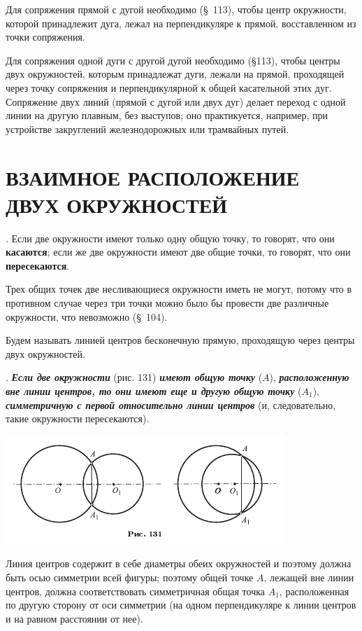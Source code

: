 \documentclass[oneside]{book}
\begin{document}
Для сопряжения прямой с дугой необходимо (§~113), чтобы центр окружности, которой принадлежит дуга, лежал на перпендикуляре к прямой, восставленном из точки сопряжения.

Для сопряжения одной дуги с другой дугой необходимо (§113), чтобы центры двух окружностей, которым принадлежат дуги, лежали на прямой, проходящей через точку сопряжения и перпендикулярной к общей касательной этих дуг.
Сопряжение двух линий (прямой с дугой или двух дуг) делает переход с одной линии на другую плавным, без выступов;
оно практикуется, например, при устройстве закруглений железнодорожных или трамвайных путей.

\section{ВЗАИМНОЕ РАСПОЛОЖЕНИЕ ДВУХ ОКРУЖНОСТЕЙ}

.
Если две окружности имеют только одну общую точку, то говорят, что они \textbf{касаются};
если же две окружности имеют две общие точки, то говорят, что они \textbf{пересекаются}.

Трех общих точек две несливающиеся окружности иметь не могут, потому что в противном случае через три точки можно было бы провести две различные окружности, что невозможно (§~104).

Будем называть линией центров бесконечную прямую, проходящую через центры двух окружностей.

.
\textbf{\emph{Если две окружности}} (рис. 131) \textbf{\emph{имеют общую точку}} ($A$), \textbf{\emph{расположенную вне линии центров, то они имеют еще и другую общую точку}} ($A_1$), \textbf{\emph{симметричную с первой относительно линии центров}} (и, следовательно, такие окружности пересекаются).

\includegraphics{pics/ris-131}

Линия центров содержит в себе диаметры обеих окружностей и поэтому должна быть осью симметрии всей фигуры;
поэтому общей точке $A$, лежащей вне линии центров, должна соответствовать симметричная общая точка $A_1$, расположенная по другую сторону от оси симметрии (на одном перпендикуляре к линии центров и на равном расстоянии от нее).
\end{document}
